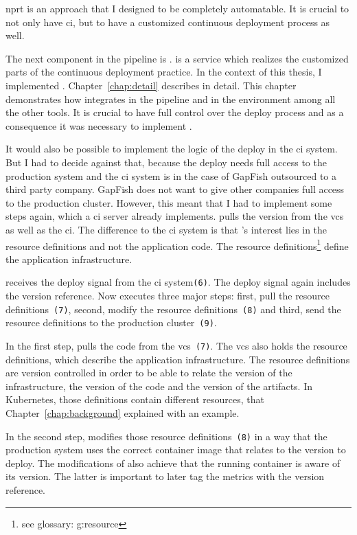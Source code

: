 \gls{nprt} is an approach that I designed to be completely automatable. It is crucial to
not only have \gls{ci}, but to have a customized continuous deployment process as well.

The next component in the pipeline is \deployer{}. \deployer{} is a service which realizes
the customized parts of the continuous deployment practice. In the context of this thesis,
I implemented \deployer{}. Chapter~\ref{chap:detail} describes \deployer{} in detail. This
chapter demonstrates how \deployer{} integrates in the pipeline and in the environment among
all the other tools. It is crucial to have full control over the deploy process and as a
consequence it was necessary to implement \deployer{}.

It would also be possible to implement the logic of the deploy in the \gls{ci} system. But
I had to decide against that, because the deploy needs full access to the production
system and the \gls{ci} system is in the case of GapFish outsourced to a third party company. GapFish does
not want to give other companies full access to the production cluster. However, this
meant that I had to implement some steps again, which a \gls{ci} server already
implements. \deployer{} pulls the version from the \gls{vcs} as well as the \gls{ci}. The
difference to the \gls{ci} system is that \deployer{}'s interest lies in the resource
definitions and not the application code. The resource definitions\footnote{see glossary:
  \gls{g:resource}} define the application infrastructure.

\deployer{} receives the deploy signal from the \gls{ci} system\texttt{(6)}. The deploy
signal again includes the version reference. Now \deployer{} executes three major steps:
first, pull the resource definitions~\texttt{(7)}, second, modify the resource
definitions~\texttt{(8)} and third, send the resource definitions to the production
cluster~\texttt{(9)}.

In the first step, \deployer{} pulls the code from the \gls{vcs}~\texttt{(7)}. The \gls{vcs}
also holds the resource definitions, which describe the application infrastructure. The resource
definitions are version controlled in order to be able to relate the version of the infrastructure, the version of the code and
the version of the artifacts. In Kubernetes, those definitions contain different resources,
that Chapter~\ref{chap:background} explained with an example.

In the second step, \deployer{} modifies those resource definitions~\texttt{(8)} in a way
that the production system uses the correct container image that relates to the version
to deploy. The modifications of \deployer{} also achieve that the running container is aware
of its version. The latter is important to later tag the metrics with the version
reference.

